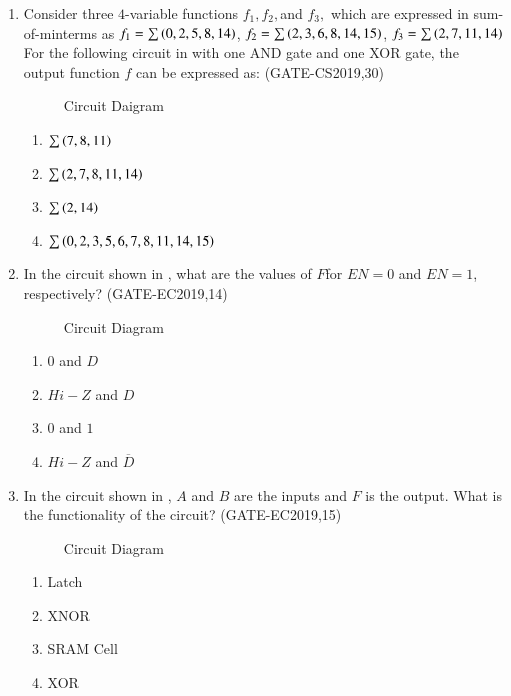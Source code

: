 \begin{enumerate}[label=\arabic*.,ref=\theenumi]
\item Consider three $4$-variable functions $f_1, f_2, $and $f_3,$ which are expressed in sum-of-minterms as \newline \quad $f_1 = \sum\left(0,2,5,8,14\right)$, \quad $f_2=\sum\left(2,3,6,8,14,15\right)$, \quad $f_3 = \sum\left(2,7,11,14\right)$ \newline For the following circuit 
	in 
	with one AND gate and one XOR gate, the output function $f$ can be expressed as:
	\hfill(GATE-CS2019,30)
	\begin{figure}[!ht]
		 \centering
		 \resizebox{\columnwidth}{!}{%
			
			}
                 \caption{Circuit Daigram}
	\label{fig:GATE-CS2019,30}
	\end{figure}
		\begin{enumerate}
		\item $\sum\left(7,8,11\right)$
		\item $\sum\left(2,7,8,11,14\right)$
		\item $\sum\left(2,14\right)$
		\item $\sum\left(0,2,3,5,6,7,8,11,14,15\right)$
		\end{enumerate}

\item In the circuit shown
	in ,
	what are the values of $F$for $EN=0$ and $EN=1$,  respectively?
 \hfill(GATE-EC2019,14)  

\begin{figure}
    \centering
    \resizebox{\columnwidth}{!}{%
    
	}
    \caption{Circuit Diagram}
	\label{fig:GATE-EC2019,14} 
\end{figure}
\begin{enumerate}
    \item $0$ and $D$
    \item $Hi-Z$ and $D$
    \item $0$ and $1$
    \item $Hi-Z$ and $\overline{D}$
\end{enumerate}
\item In the circuit shown
	   in ,
	$A$ and $B$ are the inputs and $F$ is the output. What is the functionality of the circuit?
           \hfill(GATE-EC2019,15)
           
\begin{figure}[!ht]
\centering
\resizebox{\columnwidth}{!}{%

	}
\caption{Circuit Diagram}
	   \label{fig:GATE-EC2019,15}
\end{figure}
\begin{enumerate}
\item Latch
\item XNOR
\item SRAM Cell
\item XOR
\end{enumerate}


\end{enumerate}
